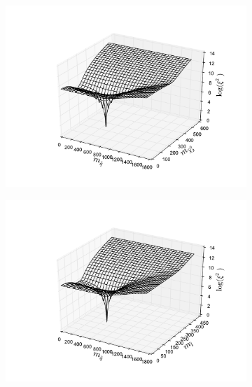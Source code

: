 \documentclass[twoside,english]{uiofysmaster}
\begin{document}
\begin{figure}[hbt]
	\centering
	\begin{subfigure}[b]{0.49\textwidth}
		\includegraphics[width=\textwidth]{figures/3D_plot_xisquared_25_simplistic_events_squark-chi2.pdf} 
		\caption{}
	\end{subfigure}
	\begin{subfigure}[b]{0.49\textwidth}
		\includegraphics[width=\textwidth]{figures/3D_plot_xisquared_25_simplistic_events_squark-slepton.pdf} 
		\caption{}
	\end{subfigure}


\end{figure}
\end{document}
